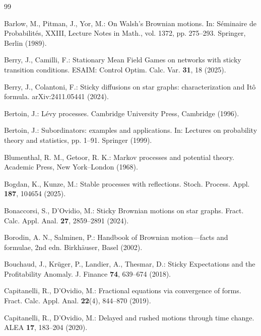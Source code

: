 \documentclass[11pt,a4paper]{article}
\theoremstyle{plain}
\theoremstyle{definition}
\theoremstyle{remark}
\begin{document}
		
		\medskip
		\begin{thebibliography}{99}
			
			Barlow, M., Pitman, J., Yor, M.:
			On Walsh's Brownian motions. In: S\'eminaire de Probabilit\'es, XXIII, Lecture Notes in Math., vol. 1372, pp. 275--293. Springer, Berlin (1989).
			
			Berry, J., Camilli, F.:
			Stationary Mean Field Games on networks with sticky transition conditions. ESAIM: Control Optim. Calc. Var. \textbf{31}, 18 (2025).
			
			Berry, J., Colantoni, F.:
			Sticky diffusions on star graphs: characterization and It\^o formula. arXiv:2411.05441 (2024).
			
			Bertoin, J.:
			L\'evy processes. Cambridge University Press, Cambridge (1996).
			
			Bertoin, J.:
			Subordinators: examples and applications. In: Lectures on probability theory and statistics, pp. 1--91. Springer (1999).
			
			Blumenthal, R. M., Getoor, R. K.:
			Markov processes and potential theory. Academic Press, New York--London (1968).
			
			Bogdan, K., Kunze, M.:
			Stable processes with reflections. Stoch. Process. Appl. \textbf{187}, 104654 (2025).
			
			Bonaccorsi, S., D'Ovidio, M.:
			Sticky Brownian motions on star graphs.
			Fract. Calc. Appl. Anal. \textbf{27}, 2859--2891 (2024).
			
			Borodin, A. N., Salminen, P.:
			Handbook of Brownian motion—facts and formulae, 2nd edn. Birkh\"auser, Basel (2002).
			
			Bouchaud, J., Kr\"uger, P., Landier, A., Thesmar, D.:
			Sticky Expectations and the Profitability Anomaly. J. Finance \textbf{74}, 639--674 (2018).
			
			Capitanelli, R., D'Ovidio, M.:
			Fractional equations via convergence of forms. Fract. Calc. Appl. Anal. \textbf{22}(4), 844--870 (2019).
			
			Capitanelli, R., D'Ovidio, M.:
			Delayed and rushed motions through time change. ALEA \textbf{17}, 183--204 (2020).
			

\end{thebibliography}
\end{document}
